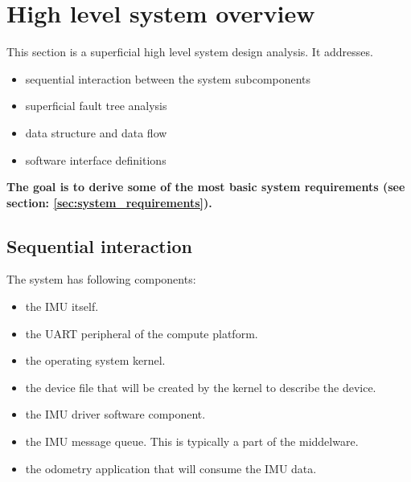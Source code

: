 \section{High level system overview}
This section is a superficial high level system design analysis. It addresses.
\begin{itemize}
    \item sequential interaction between the system subcomponents
    \item superficial fault tree analysis
    \item data structure and data flow
    \item software interface definitions
\end{itemize}
\textbf{The goal is to derive some of the most basic system requirements (see section: \ref{sec:system_requirements}).}

\subsection{Sequential interaction}
The system has following components:
\begin{itemize}
    \item the IMU itself.
    \item the UART peripheral of the compute platform.
    \item the operating system kernel.
    \item the device file that will be created by the kernel to describe the device.
    \item the IMU driver software component.
    \item the IMU message queue. This is typically a part of the middelware.
    \item the odometry application that will consume the IMU data.
\end{itemize}

